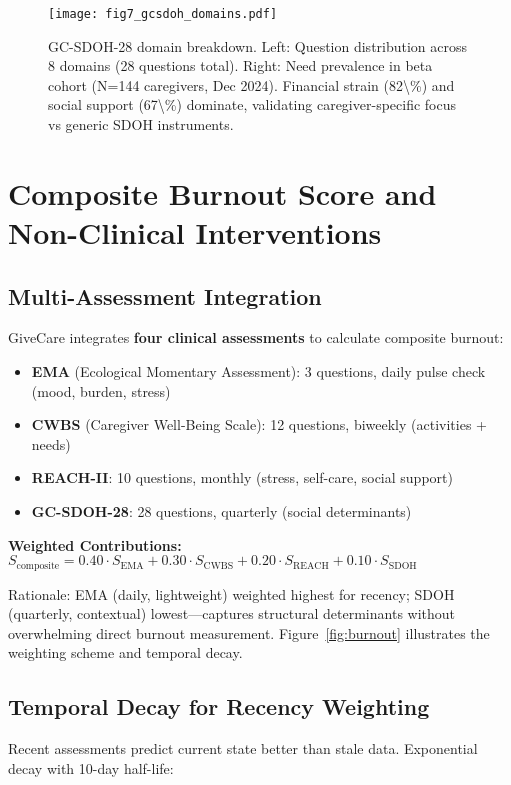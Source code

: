 \documentclass{article}
\begin{document}
%
\begin{figure}[htbp]%
\centering%
\texttt{[image: fig7\_gcsdoh\_domains.pdf]}%
\caption{GC{-}SDOH{-}28 domain breakdown. Left: Question distribution across 8 domains (28 questions total). Right: Need prevalence in beta cohort (N=144 caregivers, Dec 2024). Financial strain (82\textbackslash{}\%) and social support (67\textbackslash{}\%) dominate, validating caregiver{-}specific focus vs generic SDOH instruments.}%
\label{fig:gcsdoh}%
\end{figure}%
\section{Composite Burnout Score and Non{-}Clinical Interventions}%
\label{sec:CompositeBurnoutScoreandNon{-}ClinicalInterventions}%
%
\subsection{Multi{-}Assessment Integration}%
\label{subsec:Multi{-}AssessmentIntegration}%
GiveCare integrates \textbf{four clinical assessments} to calculate composite burnout:

\begin{itemize}
    \item \textbf{EMA} (Ecological Momentary Assessment): 3 questions, daily pulse check (mood, burden, stress)
    \item \textbf{CWBS} (Caregiver Well-Being Scale): 12 questions, biweekly (activities + needs)~\cite{tebb1999}
    \item \textbf{REACH-II}: 10 questions, monthly (stress, self-care, social support)~\cite{bella2006}
    \item \textbf{GC-SDOH-28}: 28 questions, quarterly (social determinants)
\end{itemize}

\textbf{Weighted Contributions:} $S_{\text{composite}} = 0.40 \cdot S_{\text{EMA}} + 0.30 \cdot S_{\text{CWBS}} + 0.20 \cdot S_{\text{REACH}} + 0.10 \cdot S_{\text{SDOH}}$

Rationale: EMA (daily, lightweight) weighted highest for recency; SDOH (quarterly, contextual) lowest—captures structural determinants without overwhelming direct burnout measurement. Figure~\ref{fig:burnout} illustrates the weighting scheme and temporal decay.

%
\subsection{Temporal Decay for Recency Weighting}%
\label{subsec:TemporalDecayforRecencyWeighting}%
Recent assessments predict current state better than stale data. Exponential decay with 10-day half-life:
\end{document}
